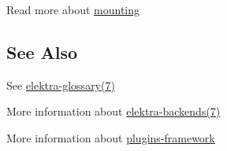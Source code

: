 Read more about \hyperlink{doc_help_elektra-mounting_md}{mounting}

\subsection*{See Also}


\begin{DoxyItemize}
\item See \hyperlink{doc_help_elektra-glossary_md}{elektra-\/glossary(7)}
\item More information about \hyperlink{doc_help_elektra-backends_md}{elektra-\/backends(7)}
\item More information about \hyperlink{doc_dev_plugins-framework_md}{plugins-\/framework} 
\end{DoxyItemize}